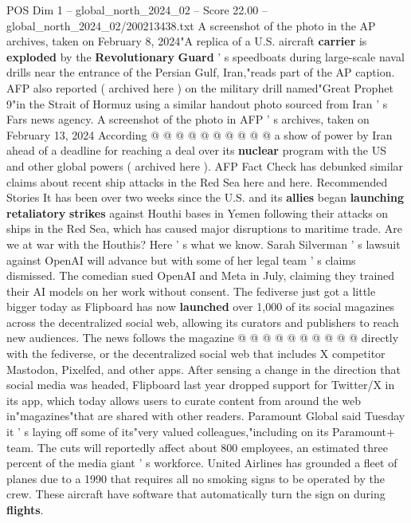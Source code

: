 \begin{textsample}{POS Dim 1 – global\_north\_2024\_02 – Score 22.00 – global\_north\_2024\_02/200213438.txt}
A screenshot of the photo in the AP archives, taken on February 8, 2024"A replica of a U.S. aircraft \textbf{carrier} is \textbf{exploded} by the \textbf{Revolutionary} \textbf{Guard} ' s speedboats during large-scale naval drills near the entrance of the Persian Gulf, Iran,"reads part of the AP caption.
AFP also reported ( archived here ) on the military drill named"Great Prophet 9"in the Strait of Hormuz using a similar handout photo sourced from Iran ' s Fars news agency.
A screenshot of the photo in AFP ' s archives, taken on February 13, 2024 According @ @ @ @ @ @ @ @ @ @ a show of power by Iran ahead of a deadline for reaching a deal over its \textbf{nuclear} program with the US and other global powers ( archived here ).
AFP Fact Check has debunked similar claims about recent ship attacks in the Red Sea here and here.
Recommended Stories It has been over two weeks since the U.S. and its \textbf{allies} began \textbf{launching} \textbf{retaliatory} \textbf{strikes} against Houthi bases in Yemen following their attacks on ships in the Red Sea, which has caused major disruptions to maritime trade.
Are we at war with the Houthis?
Here ' s what we know.
Sarah Silverman ' s lawsuit against OpenAI will advance but with some of her legal team ' s claims dismissed.
The comedian sued OpenAI and Meta in July, claiming they trained their AI models on her work without consent.
The fediverse just got a little bigger today as Flipboard has now \textbf{launched} over 1,000 of its social magazines across the decentralized social web, allowing its curators and publishers to reach new audiences.
The news follows the magazine @ @ @ @ @ @ @ @ @ @ directly with the fediverse, or the decentralized social web that includes X competitor Mastodon, Pixelfed, and other apps.
After sensing a change in the direction that social media was headed, Flipboard last year dropped support for Twitter/X in its app, which today allows users to curate content from around the web in"magazines"that are shared with other readers.
Paramount Global said Tuesday it ' s laying off some of its"very valued colleagues,"including on its Paramount+ team.
The cuts will reportedly affect about 800 employees, an estimated three percent of the media giant ' s workforce.
United Airlines has grounded a fleet of planes due to a 1990 that requires all no smoking signs to be operated by the crew.
These aircraft have software that automatically turn the sign on during \textbf{flights}.

\end{textsample}

